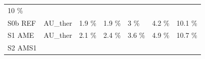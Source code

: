 \documentclass[]{article}
\begin{document}
\begin{longtable}[]{@{}lllllll@{}}
\begin{minipage}[t]{0.11\columnwidth}
10 \%\strut
\end{minipage}\tabularnewline
\begin{minipage}[t]{0.14\columnwidth}\raggedright\strut
S0b REF\strut
\end{minipage} & \begin{minipage}[t]{0.13\columnwidth}\raggedright\strut
AU\_ther\strut
\end{minipage} & \begin{minipage}[t]{0.11\columnwidth}\raggedright\strut
1.9 \%\strut
\end{minipage} & \begin{minipage}[t]{0.11\columnwidth}\raggedright\strut
1.9 \%\strut
\end{minipage} & \begin{minipage}[t]{0.11\columnwidth}\raggedright\strut
3 \%\strut
\end{minipage} & \begin{minipage}[t]{0.11\columnwidth}\raggedright\strut
4.2 \%\strut
\end{minipage} & \begin{minipage}[t]{0.11\columnwidth}\raggedright\strut
10.1 \%\strut
\end{minipage}\tabularnewline
\begin{minipage}[t]{0.14\columnwidth}\raggedright\strut
S1 AME\strut
\end{minipage} & \begin{minipage}[t]{0.13\columnwidth}\raggedright\strut
AU\_ther\strut
\end{minipage} & \begin{minipage}[t]{0.11\columnwidth}\raggedright\strut
2.1 \%\strut
\end{minipage} & \begin{minipage}[t]{0.11\columnwidth}\raggedright\strut
2.4 \%\strut
\end{minipage} & \begin{minipage}[t]{0.11\columnwidth}\raggedright\strut
3.6 \%\strut
\end{minipage} & \begin{minipage}[t]{0.11\columnwidth}\raggedright\strut
4.9 \%\strut
\end{minipage} & \begin{minipage}[t]{0.11\columnwidth}\raggedright\strut
10.7 \%\strut
\end{minipage}\tabularnewline
\begin{minipage}[t]{0.14\columnwidth}\raggedright\strut
S2 AMS1\strut
\end{minipage} & \begin{minipage}[t]{0.13\columnwidth}\raggedright\strut

\end{minipage}
\end{longtable}
\end{document}
